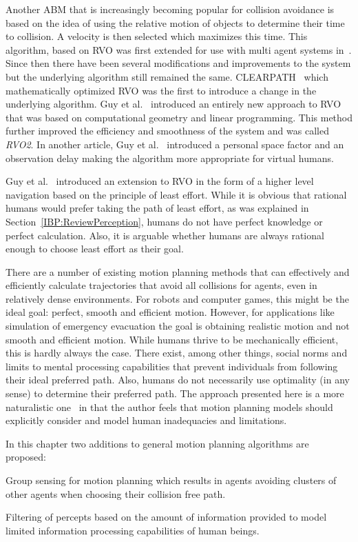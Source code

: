Another ABM that is increasingly becoming popular for collision avoidance is based on the idea of using the relative motion of objects to determine their time to collision. A velocity is then selected which maximizes this time. This algorithm, based on RVO was first extended for use with multi agent systems in~\cite{vandenBerg:2008cq}. Since then there have been several modifications and improvements to the system but the underlying algorithm still remained the same. CLEARPATH~\cite{Guy:2009gu} which mathematically optimized RVO was the first to introduce a change in the underlying algorithm. Guy et al.~\cite{Guy:2010ko} introduced an entirely new approach to RVO that was based on computational geometry and linear programming. This method further improved the efficiency and smoothness of the system and was called \emph{RVO2}. In another article, Guy et al.~\cite{Guy:2010uv} introduced a personal space factor and an observation delay making the algorithm more appropriate for virtual humans.

Guy et al.~\cite{Guy:2010uv} introduced an extension to RVO in the form of a higher level navigation based on the principle of least effort. While it is obvious that rational humans would prefer taking the path of least effort, as was explained in Section~\ref{IBP:ReviewPerception}, humans do not have perfect knowledge or perfect calculation. Also, it is arguable whether humans are always rational enough to choose least effort as their goal.

There are a number of existing motion planning methods that can effectively and efficiently calculate trajectories that avoid all collisions for agents, even in relatively dense environments. For robots and computer games, this might be the ideal goal: perfect, smooth and efficient motion. However, for applications like simulation of emergency evacuation the goal is obtaining realistic motion and not smooth and efficient motion. While humans thrive to be mechanically efficient, this is hardly always the case. There exist, among other things, social norms and limits to mental processing capabilities that prevent individuals from following their ideal preferred path. Also, humans do not necessarily use optimality (in any sense) to determine their preferred path. The approach presented here is a more naturalistic one~\cite{Klein:2009} in that the author feels that motion planning models should explicitly consider and model human inadequacies and limitations.

In this chapter two additions to general motion planning algorithms are proposed:
\begin{inparaenum}
\item Group sensing for motion planning which results in agents avoiding clusters of other agents when choosing their collision free path.
\item Filtering of percepts based on the amount of information provided to model limited information processing capabilities of human beings.
\end{inparaenum}

